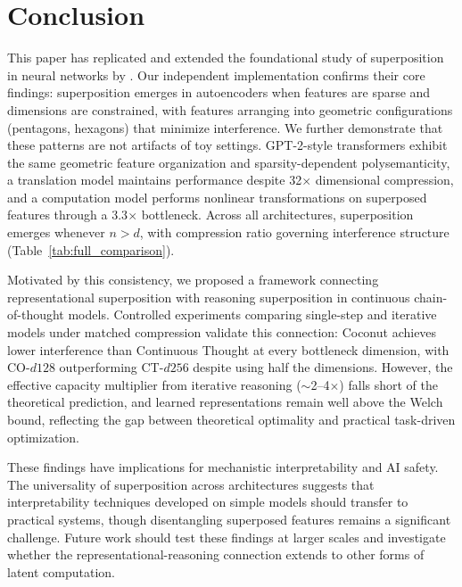 \section{Conclusion}

This paper has replicated and extended the foundational study of superposition in neural networks by \citet{elhage2022toy}. Our independent implementation confirms their core findings: superposition emerges in autoencoders when features are sparse and dimensions are constrained, with features arranging into geometric configurations (pentagons, hexagons) that minimize interference. We further demonstrate that these patterns are not artifacts of toy settings. GPT-2-style transformers exhibit the same geometric feature organization and sparsity-dependent polysemanticity, a translation model maintains performance despite 32$\times$ dimensional compression, and a computation model performs nonlinear transformations on superposed features through a 3.3$\times$ bottleneck. Across all architectures, superposition emerges whenever $n > d$, with compression ratio governing interference structure (Table~\ref{tab:full_comparison}).

Motivated by this consistency, we proposed a framework connecting representational superposition with reasoning superposition in continuous chain-of-thought models. Controlled experiments comparing single-step and iterative models under matched compression validate this connection: Coconut achieves lower interference than Continuous Thought at every bottleneck dimension, with CO-$d128$ outperforming CT-$d256$ despite using half the dimensions. However, the effective capacity multiplier from iterative reasoning ($\sim$2--4$\times$) falls short of the theoretical prediction, and learned representations remain well above the Welch bound, reflecting the gap between theoretical optimality and practical task-driven optimization.

These findings have implications for mechanistic interpretability and AI safety. The universality of superposition across architectures suggests that interpretability techniques developed on simple models should transfer to practical systems, though disentangling superposed features remains a significant challenge. Future work should test these findings at larger scales and investigate whether the representational-reasoning connection extends to other forms of latent computation.
